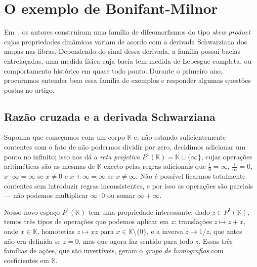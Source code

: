 \documentclass[../fapesp0]{subfiles}
\begin{document}
\section{O exemplo de Bonifant-Milnor}
Em~\cite{bonifantSchwarzianDerivativesCylinder2008}, os autores construíram uma família de difeomorfismos do tipo \textit{skew product} cujas propriedades dinâmicas variam de acordo com a derivada Schwarziana dos mapas nas fibras. Dependendo do sinal dessa derivada, a família possui bacias entrelaçadas, uma medida física cuja bacia tem medida de Lebesgue completa, ou comportamento histórico em quase todo ponto. Durante o primeiro ano, procuramos entender bem essa família de exemplos e responder algumas questões postas no artigo.


\subsection{Razão cruzada e a derivada Schwarziana}

Suponha que começamos com um corpo \(\mathbb{K}\) e, não estando suficientemente contentes com o fato de não podermos dividir por zero, decidimos adicionar um ponto no infinito; isso nos dá a \textit{reta projetiva} \(P^1(\mathbb{K}) = \mathbb{K} \sqcup \{ \infty \}\), cujas operações aritiméticas são as mesmas de \(\mathbb{K}\) exceto pelas regras adicionais que
\(\frac{1}{0} = \infty\), \(\frac{1}{\infty} = 0\), \(x \cdot \infty = \infty\) se \(x \neq 0\) e \(x + \infty = \infty\) se \(x \neq \infty\).
Não é possível ficarmos totalmente contentes sem introduzir regras inconsistentes, e por isso as operações são parciais --- não podemos multiplicar \(\infty \cdot 0\) ou somar \(\infty + \infty\).

Nosso novo espaço \(P^1(\mathbb{K})\) tem uma propriedade interessante: dado \(z \in P^1(\mathbb{K})\), temos três tipos de operações que podemos aplicar em \(z\): translações \(z \mapsto z + x\), onde \(x \in \mathbb{K}\), homotetias \(z \mapsto xz\) para \(x \in \mathbb{K} \setminus \{ 0 \}\), e a inversa \(z \mapsto 1/z\), que antes não era definida se \(z = 0\), mas que agora faz sentido para todo \(z\). Essas três famílias de ações, que são invertíveis, geram o \textit{grupo de homografias} com coeficientes em \(\mathbb{K}\).
\end{document}
